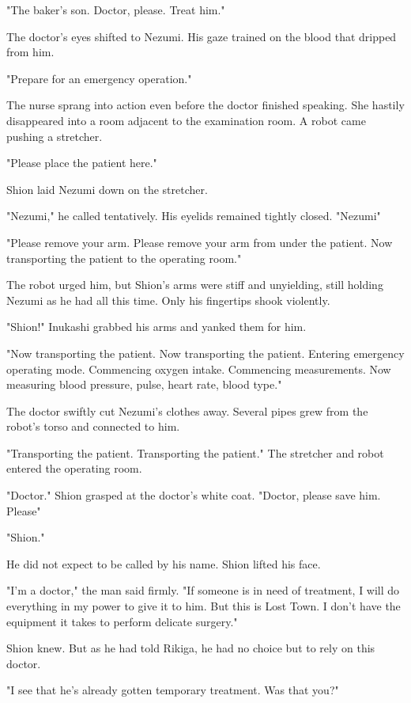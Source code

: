 "The baker's son. Doctor, please. Treat him."

The doctor's eyes shifted to Nezumi. His gaze trained on the blood that
dripped from him.

"Prepare for an emergency operation."

The nurse sprang into action even before the doctor finished speaking.
She hastily disappeared into a room adjacent to the examination room. A
robot came pushing a stretcher.

{\sffamily "Please place the patient here."}

Shion laid Nezumi down on the stretcher.

"Nezumi," he called tentatively. His eyelids remained tightly closed.
"Nezumi\el "

{\sffamily "Please remove your arm. Please remove your arm from under the patient.
Now transporting the patient to the operating room."}

The robot urged him, but Shion's arms were stiff and unyielding, still
holding Nezumi as he had all this time. Only his fingertips shook
violently.

"Shion!" Inukashi grabbed his arms and yanked them for him.

{\sffamily "Now transporting the patient. Now transporting the patient. Entering
	emergency operating mode. Commencing oxygen intake. Commencing
	measurements. Now measuring blood pressure, pulse, heart rate, blood
	type."}

The doctor swiftly cut Nezumi's clothes away. Several pipes grew from
the robot's torso and connected to him.

{\sffamily "Transporting the patient. Transporting the patient."} The stretcher and
robot entered the operating room.

"Doctor." Shion grasped at the doctor's white coat. "Doctor, please\el 
save him. Please\el "

"Shion."

He did not expect to be called by his name. Shion lifted his face.

"I'm a doctor," the man said firmly. "If someone is in need of
treatment, I will do everything in my power to give it to him. But this
is Lost Town. I don't have the equipment it takes to perform delicate
surgery."

Shion knew. But as he had told Rikiga, he had no choice but to rely on
this doctor.

"I see that he's already gotten temporary treatment. Was that you?"

